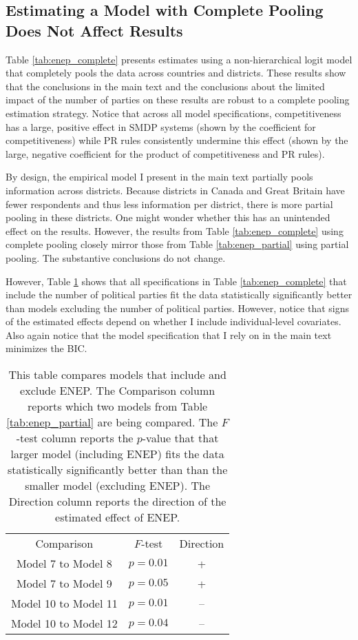 \documentclass[12pt]{article}
\begin{document}
\begin{appendix}
\clearpage
\subsection{Estimating a Model with Complete Pooling Does Not Affect Results}

Table \ref{tab:enep_complete} presents estimates using a non-hierarchical logit model that completely pools the data across countries and districts. These results show that the conclusions in the main text and the conclusions about the limited impact of the number of parties on these results are robust to a complete pooling estimation strategy. Notice that across all model specifications, competitiveness has a large, positive effect in SMDP systems (shown by the coefficient for competitiveness) while PR rules consistently undermine this effect (shown by the large, negative coefficient for the product of competitiveness and PR rules).

By design, the empirical model I present in the main text partially pools information across districts. Because districts in Canada and Great Britain have fewer respondents and thus less information per district, there is more partial pooling in these districts. One might wonder whether this has an unintended effect on the results. However, the results from Table \ref{tab:enep_complete} using complete pooling closely mirror those from Table \ref{tab:enep_partial} using partial pooling. The substantive conclusions do not change.

However, Table \ref{tab:F_complete} shows that all specifications in Table \ref{tab:enep_complete} that include the number of political parties  fit the data statistically significantly better than models excluding the number of political parties. However, notice that signs of the estimated effects depend on whether I include individual-level covariates. Also again notice that the model specification that I rely on in the main text minimizes the BIC.




 \begin{table}[h!]
 \begin{center}
 \begin{tabular}{c c c}
 Comparison & $F$-test & Direction \\
 Model 7 to Model 8 & $p = 0.01$ & + \\
 Model 7 to Model 9 & $p = 0.05$ & + \\
 Model 10 to Model 11 & $p = 0.01$ & -- \\
 Model 10 to Model 12 & $p = 0.04$ & -- \\
 \end{tabular} \caption{This table compares models that include and exclude ENEP. The Comparison column reports which two models from Table \ref{tab:enep_partial} are being compared. The $F$-test column reports the $p$-value that that larger model (including ENEP) fits the data statistically significantly better than than the smaller model (excluding ENEP). The Direction column reports the direction of the estimated effect of ENEP.}\label{tab:F_complete}
 \end{center}
 \end{table}


\end{appendix}
\end{document}

